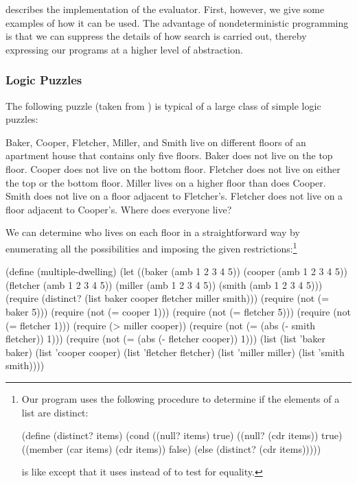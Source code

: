  describes the implementation of the  evaluator.
First, however, we give some examples of how it can be used.  The advantage of
nondeterministic programming is that we can suppress the details of how search
is carried out, thereby expressing our programs at a higher level of
abstraction.

\subsubsection*{Logic Puzzles}

The following puzzle (taken from ) is typical of a large class of
simple logic puzzles:

\begin{niceQuote}
Baker, Cooper, Fletcher, Miller, and Smith live on different floors of an
apartment house that contains only five floors. Baker does not live on the top
floor. Cooper does not live on the bottom floor. Fletcher does not live on
either the top or the bottom floor. Miller lives on a higher floor than does
Cooper. Smith does not live on a floor adjacent to Fletcher's. Fletcher does
not live on a floor adjacent to Cooper's. Where does everyone live?
\end{niceQuote}

\noindent
We can determine who lives on each floor in a straightforward way by
enumerating all the possibilities and imposing the given
restrictions:\footnote{Our program uses the following procedure to determine if
the elements of a list are distinct:

\begin{compactCodeBlock}
(define (distinct? items)
  (cond ((null? items) true)
        ((null? (cdr items)) true)
        ((member (car items) (cdr items)) false)
        (else (distinct? (cdr items)))))
\end{compactCodeBlock}

\noindent
{} is like  except that it uses  instead
of  to test for equality.}

\begin{codeBlock}
(define (multiple-dwelling)
  (let ((baker    (amb 1 2 3 4 5)) (cooper (amb 1 2 3 4 5))
        (fletcher (amb 1 2 3 4 5)) (miller (amb 1 2 3 4 5))
        (smith    (amb 1 2 3 4 5)))
    (require
     (distinct? (list baker cooper fletcher miller smith)))
    (require (not (= baker 5)))
    (require (not (= cooper 1)))
    (require (not (= fletcher 5)))
    (require (not (= fletcher 1)))
    (require (> miller cooper))
    (require (not (= (abs (- smith fletcher)) 1)))
    (require (not (= (abs (- fletcher cooper)) 1)))
    (list (list 'baker baker)       (list 'cooper cooper)
          (list 'fletcher fletcher) (list 'miller miller)
          (list 'smith smith))))
\end{codeBlock}

